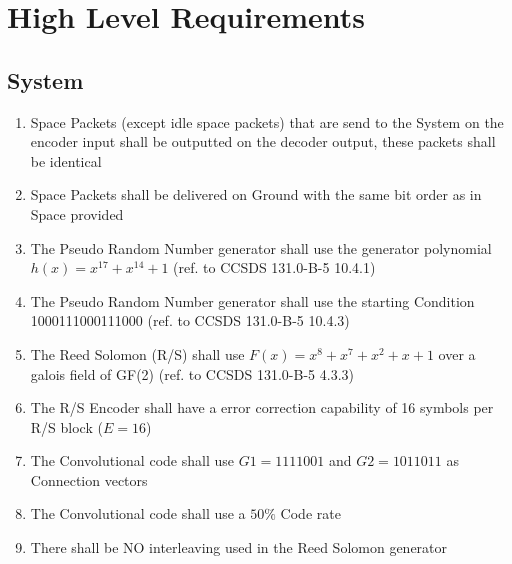\chapter{High Level Requirements}

\section{System}
\begin{enumerate}[leftmargin=\dimexpr\linewidth-13cm-\rightmargin\relax,label={\bfseries{SYS-REQ-\arabic*}}]
    \item Space Packets (except idle space packets) that are send to the System on the encoder input shall be outputted on the decoder output, these packets shall be identical
    \item Space Packets shall be delivered on Ground with the same bit order as in Space provided
    \item The Pseudo Random Number generator shall use the generator polynomial \(h(x) = x^{17} + x^{14} + 1\) (ref. to CCSDS 131.0-B-5 10.4.1)
    \item The Pseudo Random Number generator shall use the starting Condition 1000111000111000 (ref. to CCSDS 131.0-B-5 10.4.3)
    \item The Reed Solomon (R/S) shall use \(F(x) = x^8 + x^7 + x^2 + x + 1\) over a galois field of GF(2) (ref. to CCSDS 131.0-B-5 4.3.3)
    \item The R/S Encoder shall have a error correction capability of 16 symbols per R/S block ($E=16$)
    \item The Convolutional code shall use $G1 = 1111001$ and $G2 = 1011011$ as Connection vectors
    \item The Convolutional code shall use a $50\%$ Code rate
    \item There shall be NO interleaving used in the Reed Solomon generator
\end{enumerate}

